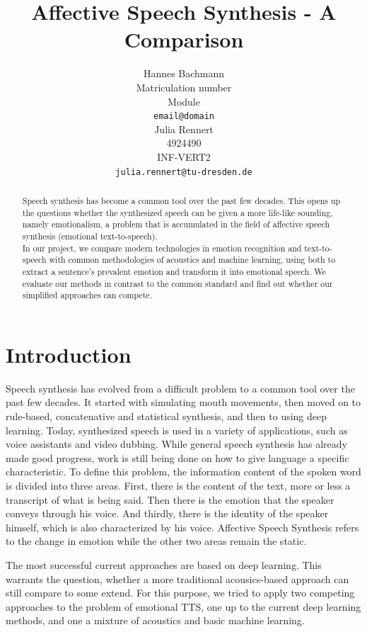\documentclass[11pt]{article}
\title{Affective Speech Synthesis - A Comparison}
\author{Hannes Bachmann\\
  Matriculation number\\
  Module \\
  \texttt{email@domain} 
  \\\And
  Julia Rennert \\
  4924490\\
  INF-VERT2 \\
  \texttt{julia.rennert@tu-dresden.de}
  }
\begin{document}
\maketitle
\begin{abstract}
Speech synthesis has become a common tool over the past few decades. This opens up the questions whether the synthesized speech can be given a more life-like sounding, namely emotionalism, a problem that is accumulated in the field of affective speech synthesis (emotional text-to-speech). \\
In our project, we compare modern technologies in emotion recognition and text-to-speech with common methodologies of acoustics and machine learning, using both to extract a sentence's prevalent emotion and transform it into emotional speech. We evaluate our methods in contrast to the common standard and find out whether our simplified approaches can compete.
\end{abstract}

\section{Introduction}
Speech synthesis has evolved from a difficult problem to a common tool over the past few decades.
It started with simulating mouth movements, then moved on to rule-based, concatenative and
statistical synthesis, and then to using deep learning. Today, synthesized speech is used in a
variety of applications, such as voice assistants and video dubbing.
While general speech synthesis has already made good progress, work is still being done on
how to give language a specific characteristic. To define this problem, the information content of
the spoken word is divided into three areas. First, there is the content of the text, more or less
a transcript of what is being said. Then there is the emotion that the speaker conveys through
his voice. And thirdly, there is the identity of the speaker himself, which is also characterized by
his voice. Affective Speech Synthesis refers to the change in emotion while the other two areas remain the static.

The most successful current approaches are based on deep learning\cite{triantafyllopoulos_overview_2023, cho_multi-speaker_2021, diatlova_emospeech_2023}. This warrants the question, whether a more traditional acousics-based approach can still compare to some extend. For this purpose, we tried to apply two competing approaches to the problem of emotional TTS, one up to the current deep learning methods, and one a mixture of acoustics and basic machine learning. 
\end{document}
